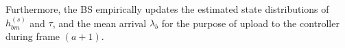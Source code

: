 \documentclass[conference]{IEEEtran}
\begin{document}
%
%
%
Furthermore, the BS empirically updates the estimated state distributions of ${h}_{bm}^{(s)}$ and $\tau$, and the mean arrival ${\lambda}_{b}$ for the purpose of upload to the controller during frame $(a+1)$.
%
%
%
\end{document}
